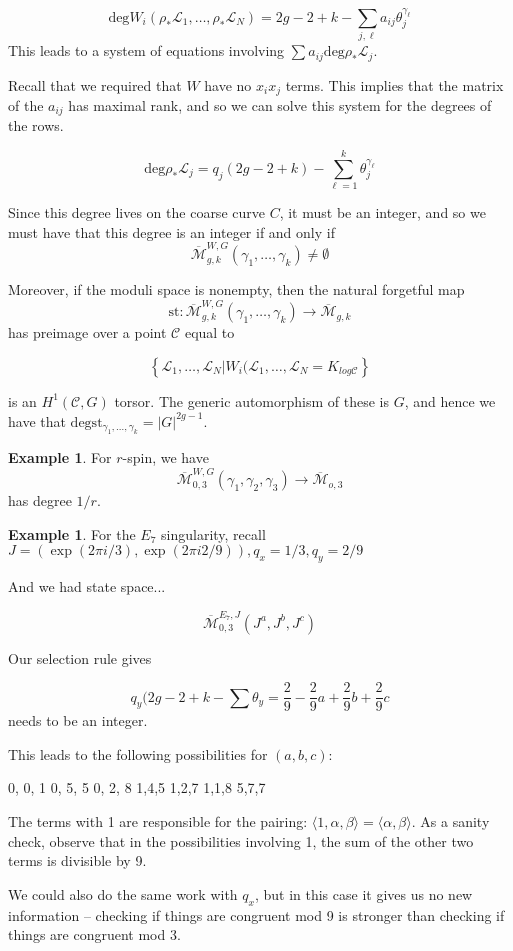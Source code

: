\documentclass{amsart}
\theoremstyle{definition}
\newtheorem{example}[dummy]{Example}
\newcommand{\Mbar}{\overline{\mathcal{M}}}
\newcommand{\st}{\text{st}}
\begin{document}
$$\text{deg} W_i(\rho_*\mathcal{L}_1,\dots,\rho_*\mathcal{L}_N)=2g-2+k-\sum_{j,\ell} a_{ij}\theta_j^{\gamma_\ell}$$
This leads to a system of equations involving $\sum a_{ij}\text{deg}\rho_*\mathcal{L}_j$.

Recall that we required that $W$ have no $x_ix_j$ terms.  This implies that the matrix of the $a_{ij}$ has maximal rank, and so we can solve this system for the degrees of the rows.

$$\text{deg}\rho_*\mathcal{L}_j=q_j(2g-2+k)-\sum_{\ell=1}^k \theta_j^{\gamma_\ell}$$

Since this degree lives on the coarse curve $C$, it must be an integer, and so we must have that this degree is an integer if and only if $$\Mbar_{g,k}^{W,G}(\gamma_1,\dots,\gamma_k)\neq \emptyset$$

Moreover, if the moduli space is nonempty, then the natural forgetful map
$$\st:\Mbar_{g,k}^{W,G}(\gamma_1,\dots,\gamma_k)\to\Mbar_{g,k}$$
has preimage over a point $\mathcal{C}$ equal to

$$\left\{\mathcal{L}_1,\dots,\mathcal{L}_N|W_i(\mathcal{L}_1,\dots,\mathcal{L}_N=K_{log \mathcal{C}}\right\}$$

is an $H^1(\mathcal{C},G)$ torsor.  The generic automorphism of these is $G$, and hence we have that $\text{deg}\st_{\gamma_1,\dots,\gamma_k}=|G|^{2g-1}$.

\begin{example}
For $r$-spin, we have
$$\Mbar_{0,3}^{W,G}(\gamma_1,\gamma_2,\gamma_3)\to\Mbar_{o,3}$$
has degree $1/r$.
\end{example}

\begin{example}
For the $E_7$ singularity, recall $J=(\exp(2\pi i/3), \exp(2\pi i 2/9)), q_x=1/3, q_y=2/9$

And we had state space...

$$\Mbar_{0,3}^{E_7,J}(J^a,J^b,J^c)$$

Our selection rule gives

$$q_y(2g-2+k-\sum\theta_y=\frac{2}{9}-\frac{2}{9}a+\frac{2}{9}b+\frac{2}{9}c$$
needs to be an integer.

This leads to the following possibilities for $(a,b,c)$:

0, 0, 1
0, 5, 5
0, 2, 8
1,4,5
1,2,7
1,1,8
5,7,7

The terms with 1 are responsible for the pairing: $\langle 1,\alpha, \beta\rangle=\langle\alpha,\beta\rangle$.  As a sanity check, observe that in the possibilities involving 1, the sum of the other two terms is divisible by 9.

We could also do the same work with $q_x$, but in this case it gives us no new information -- checking if things are congruent mod 9 is stronger than checking if things are congruent mod 3.

\end{example}
\end{document}
